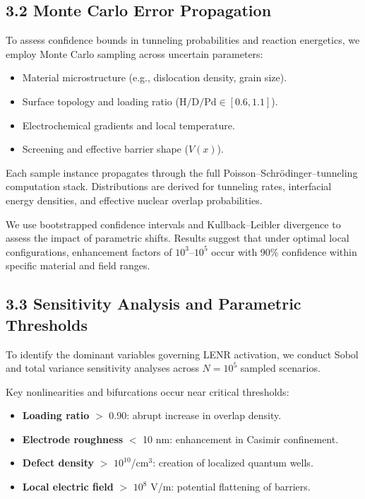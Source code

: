     \subsection{3.2 Monte Carlo Error Propagation}
    
    To assess confidence bounds in tunneling probabilities and reaction energetics, we employ Monte Carlo sampling across uncertain parameters:
    
    \begin{itemize}
        \item Material microstructure (e.g., dislocation density, grain size).
        \item Surface topology and loading ratio ($\text{H/D}/\text{Pd} \in [0.6, 1.1]$).
        \item Electrochemical gradients and local temperature.
        \item Screening and effective barrier shape ($V(x)$).
    \end{itemize}
    
    Each sample instance propagates through the full Poisson–Schrödinger–tunneling computation stack. Distributions are derived for tunneling rates, interfacial energy densities, and effective nuclear overlap probabilities.
    
    We use bootstrapped confidence intervals and Kullback–Leibler divergence to assess the impact of parametric shifts. Results suggest that under optimal local configurations, enhancement factors of $10^3$–$10^5$ occur with 90\% confidence within specific material and field ranges.
    
    \subsection{3.3 Sensitivity Analysis and Parametric Thresholds}
    
    To identify the dominant variables governing LENR activation, we conduct Sobol and total variance sensitivity analyses across $N = 10^5$ sampled scenarios.
    
    Key nonlinearities and bifurcations occur near critical thresholds:
    
    \begin{itemize}
        \item \textbf{Loading ratio} $>$ 0.90: abrupt increase in overlap density.
        \item \textbf{Electrode roughness} $<$ 10 nm: enhancement in Casimir confinement.
        \item \textbf{Defect density} $>$ $10^{10}$/cm$^3$: creation of localized quantum wells.
        \item \textbf{Local electric field} $>$ $10^8$ V/m: potential flattening of barriers.
    \end{itemize}
    
